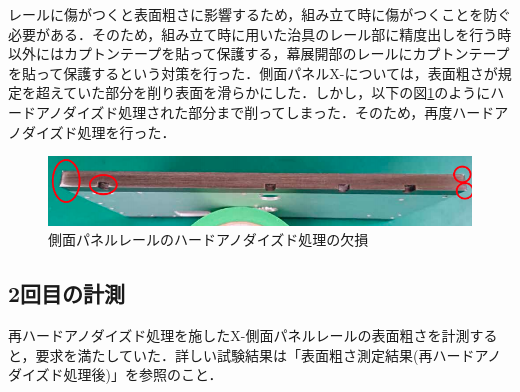 レールに傷がつくと表面粗さに影響するため，組み立て時に傷がつくことを防ぐ必要がある．そのため，組み立て時に用いた治具のレール部に精度出しを行う時以外にはカプトンテープを貼って保護する，幕展開部のレールにカプトンテープを貼って保護するという対策を行った．側面パネルX-については，表面粗さが規定を超えていた部分を削り表面を滑らかにした．しかし，以下の図\ref{fig:scrape}のようにハードアノダイズド処理された部分まで削ってしまった．そのため，再度ハードアノダイズド処理を行った．

\begin{figure}[h]
	\begin{center}
		
		\includegraphics[width=0.8\linewidth]{04/fig/scrape.png}
		\caption{側面パネルレールのハードアノダイズド処理の欠損}
		\label{fig:scrape}
		
	\end{center}
\end{figure}

\subsection{2回目の計測}

再ハードアノダイズド処理を施したX-側面パネルレールの表面粗さを計測すると，要求を満たしていた．詳しい試験結果は「表面粗さ測定結果(再ハードアノダイズド処理後)」を参照のこと．